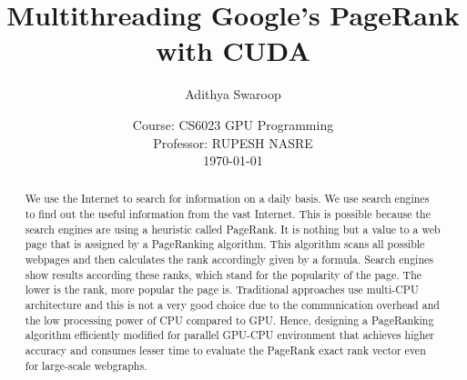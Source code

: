\documentclass[a4paper]{article}
\begin{document}
	\title{
	\vspace{1cm}
	\Huge\textbf{ Multithreading Google's PageRank with CUDA }
	}
	
	\vspace{3cm}
	
	 \author{Adithya Swaroop}	
	
	
	\date{
	\large  Course: CS6023 GPU Programming \\ 
	\vspace{0.8cm}
	\large Professor: RUPESH NASRE \\
	\vspace{1cm}
	\today
	}

	\maketitle
	\setlength{\parindent}{0pt}

\vspace{2cm}
\begin{abstract}
We use the Internet to search for information on a daily
basis. We use search engines to find out the useful
information from the vast Internet. This is possible because
the search engines are using a heuristic called PageRank. It is nothing but a value to a web page that is assigned
by a PageRanking algorithm. This algorithm scans all
possible webpages and then calculates the rank accordingly
given by a formula. Search engines show results according
these ranks, which stand for the popularity of the page. The
lower is the rank, more popular the page is. Traditional
approaches use multi-CPU architecture and this is not a
very good choice due to the communication overhead and
the low processing power of CPU compared to GPU.
Hence, designing a PageRanking algorithm efficiently
modified for parallel GPU-CPU environment that achieves
higher accuracy and consumes lesser time to evaluate the
PageRank exact rank vector even for large-scale webgraphs.


\end{abstract}
	\newpage
	\tableofcontents
	\newpage
	
\end{document}
